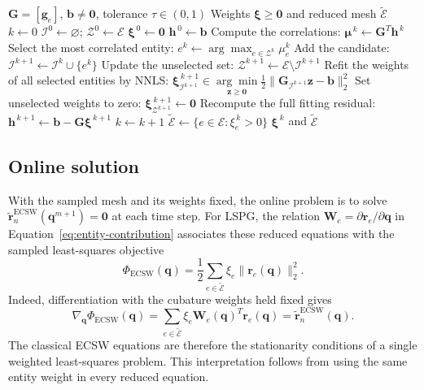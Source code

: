 \documentclass[a4paper,12pt]{article}
\newcommand{\vect}[1]{\boldsymbol{#1}}
\newcommand{\matr}[1]{\boldsymbol{#1}}
\begin{document}
\begin{algorithm}[H]
 \caption{Classical ECSW mesh sampling by NNLS}
 \label{alg:classical-training}
 \small
 \begin{algorithmic}[1]
  \Require $\matr{G}=[\vect{g}_e]$, $\vect{b}\neq\vect{0}$, tolerance $\tau\in(0,1)$
  \Ensure Weights $\vect{\xi}\geq\vect{0}$ and reduced mesh $\widetilde{\mathcal E}$
  \State $k\gets0$
  \State $\mathcal I^0\gets\varnothing$; $\mathcal Z^0\gets\mathcal E$
  \State $\vect{\xi}^{\,0}\gets\vect{0}$
  \State $\vect{h}^{\,0}\gets\vect{b}$
  \While{$\|\vect{h}^{\,k}\|_2>\tau\|\vect{b}\|_2$}
   \State Compute the correlations: $\vect{\mu}^{\,k}\gets\matr{G}^T\vect{h}^{\,k}$
   \State Select the most correlated entity: $e^k\gets\arg\max_{e\in\mathcal Z^k}\mu_e^k$
   \State Add the candidate: $\mathcal I^{k+1}\gets\mathcal I^k\cup\{e^k\}$
   \State Update the unselected set: $\mathcal Z^{k+1}\gets\mathcal E\setminus\mathcal I^{k+1}$
   \State Refit the weights of all selected entities by NNLS:
   \Statex \hspace{\algorithmicindent}$\displaystyle
      \vect{\xi}^{\,k+1}_{\mathcal I^{k+1}}\in
      \underset{\vect{z}\geq\vect{0}}{\arg\min}
      \frac12\|\matr{G}_{\mathcal I^{k+1}}\vect{z}-\vect{b}\|_2^2$
   \State Set unselected weights to zero: $\vect{\xi}^{\,k+1}_{\mathcal Z^{k+1}}\gets\vect{0}$
   \State Recompute the full fitting residual: $\vect{h}^{\,k+1}\gets\vect{b}-\matr{G}\vect{\xi}^{\,k+1}$
   \State $k\gets k+1$
  \EndWhile
  \State $\widetilde{\mathcal E}\gets\{e\in\mathcal E:\xi_e^{\,k}>0\}$
  \State \Return $\vect{\xi}^{\,k}$ and $\widetilde{\mathcal E}$
 \end{algorithmic}
\end{algorithm}

\subsection{Online solution}

With the sampled mesh and its weights fixed, the online problem is to solve $\widetilde{\vect{r}}_n^{\mathrm{ECSW}}(\vect{q}^{m+1})=\vect{0}$ at each time step. For LSPG, the relation $\matr{W}_e=\partial\vect{r}_e/\partial\vect{q}$ in Equation~\eqref{eq:entity-contribution} associates these reduced equations with the sampled least-squares objective
\begin{equation}
 \Phi_{\mathrm{ECSW}}(\vect{q})
 =\frac12\sum_{e\in\widetilde{\mathcal E}}\xi_e\|\vect{r}_e(\vect{q})\|_2^2.
 \label{eq:sampled-objective}
\end{equation}
Indeed, differentiation with the cubature weights held fixed gives
\begin{equation}
 \nabla_{\vect{q}}\Phi_{\mathrm{ECSW}}(\vect{q})
 =\sum_{e\in\widetilde{\mathcal E}}
     \xi_e\matr{W}_e(\vect{q})^T\vect{r}_e(\vect{q})
 =\widetilde{\vect{r}}_n^{\mathrm{ECSW}}(\vect{q}).
 \label{eq:sampled-gradient}
\end{equation}
The classical ECSW equations are therefore the stationarity conditions of a single weighted least-squares problem. This interpretation follows from using the same entity weight in every reduced equation.
\end{document}
